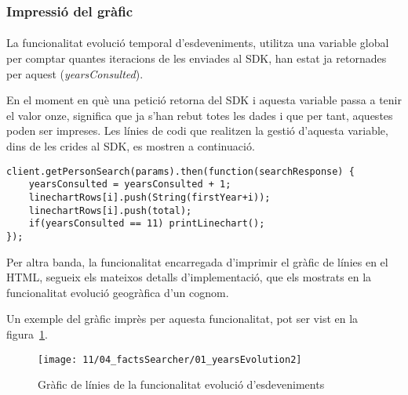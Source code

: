 \subsubsection{Impressió del gràfic}

\paragraph{}
La funcionalitat evolució temporal d'esdeveniments, utilitza una variable global per comptar quantes iteracions de les enviades al SDK, han estat ja retornades per aquest (\emph{yearsConsulted}).

En el moment en què una petició retorna del SDK i aquesta variable passa a tenir el valor onze, significa que ja s'han rebut totes les dades i que per tant, aquestes poden ser impreses. Les línies de codi que realitzen la gestió d'aquesta variable, dins de les crides al SDK, es mostren a continuació.

\begin{lstlisting}[style=rawOwn,caption={Gestió de la variable \emph{yearsConsulted}, per controlar el final de la cerca}]
client.getPersonSearch(params).then(function(searchResponse) {
    yearsConsulted = yearsConsulted + 1;
    linechartRows[i].push(String(firstYear+i));
    linechartRows[i].push(total);
    if(yearsConsulted == 11) printLinechart();
});
\end{lstlisting}

Per altra banda, la funcionalitat encarregada d’imprimir el gràfic de línies en el HTML, segueix els mateixos detalls d’implementació, que els mostrats en la fun\-cio\-na\-li\-tat evolució geogràfica d’un cognom.

Un exemple del gràfic imprès per aquesta funcionalitat, pot ser vist en la figura~\ref{fig:factsLine}.

\begin{figure}[h]
    \texttt{[image: 11/04\_factsSearcher/01\_yearsEvolution2]}
    \centering
    \caption{Gràfic de línies de la funcionalitat evolució d'esdeveniments}\label{fig:factsLine}
\end{figure}
